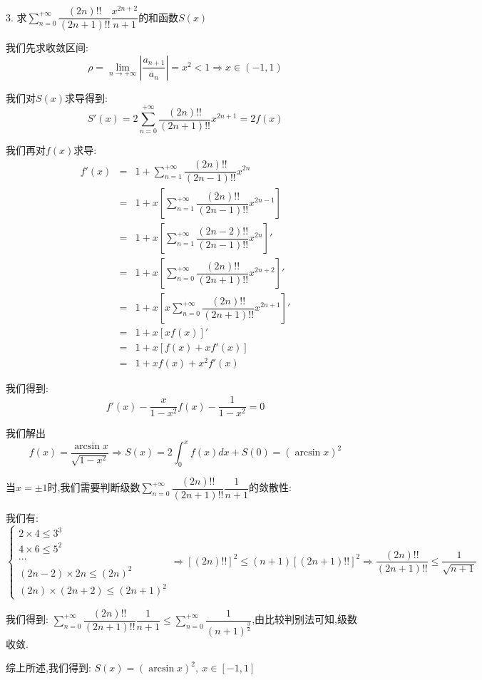 3. 求$\sum\limits_{n=0}^{+\infty}\dfrac{(2n)!!}{(2n+1)!!}\dfrac{x^{2n+2}}{n+1}$的和函数$S(x)$
\begin{solution}
	
	我们先求收敛区间: 
	$$\rho=\lim\limits_{n\rightarrow +\infty}|\dfrac{a_{n+1}}{a_{n}}|=x^2<1\Rightarrow x\in(-1,1)$$
	
	我们对$S(x)$求导得到: 
	$$S'(x)=2\sum\limits_{n=0}^{+\infty}\dfrac{(2n)!!}{(2n+1)!!}x^{2n+1}=2f(x)$$
	
	我们再对$f(x)$求导: 
	\begin{eqnarray*}
		f'(x)&=&1+\sum\limits_{n=1}^{+\infty}\dfrac{(2n)!!}{(2n-1)!!}x^{2n}\\
		&=&1+x[\sum\limits_{n=1}^{+\infty}\dfrac{(2n)!!}{(2n-1)!!}x^{2n-1}]\\
		&=&1+x[\sum\limits_{n=1}^{+\infty}\dfrac{(2n-2)!!}{(2n-1)!!}x^{2n}]'\\
		&=&1+x[\sum\limits_{n=0}^{+\infty}\dfrac{(2n)!!}{(2n+1)!!}x^{2n+2}]'\\
		&=&1+x[x\sum\limits_{n=0}^{+\infty}\dfrac{(2n)!!}{(2n+1)!!}x^{2n+1}]'\\
		&=&1+x[xf(x)]'\\
		&=&1+x[f(x)+xf'(x)]\\
		&=&1+xf(x)+x^2f'(x)
	\end{eqnarray*}

	我们得到: $$f'(x)-\dfrac{x}{1-x^2}f(x)-\dfrac{1}{1-x^2}=0$$
	
	我们解出$$f(x)=\dfrac{\arcsin x}{\sqrt{1-x^2}}\Rightarrow S(x)=2\int_{0} ^{x}f(x)dx+S(0)=(\arcsin x)^2$$
	
	当$x=\pm 1$时,我们需要判断级数$\sum\limits_{n=0}^{+\infty}\dfrac{(2n)!!}{(2n+1)!!}\dfrac{1}{n+1}$的敛散性: 
	
	我们有: $$\left\lbrace
	\begin{array}{l}
		2\times 4\leq 3^3\\
		4\times 6\leq 5^2\\
		\cdots\\
		(2n-2)\times 2n\leq (2n)^2\\
		(2n)\times(2n+2)\leq (2n+1)^2
	\end{array}
	\right. \Rightarrow [(2n)!!]^2\leq (n+1)[(2n+1)!!]^2\Rightarrow \dfrac{(2n)!!}{(2n+1)!!}\leq \dfrac{1}{\sqrt{n+1}}$$
	
	我们得到: $\sum\limits_{n=0}^{+\infty}\dfrac{(2n)!!}{(2n+1)!!}\dfrac{1}{n+1}\leq \sum\limits_{n=0}^{+\infty}\dfrac{1}{(n+1)^{\frac{3}{2}}}$,由比较判别法可知,级数收敛.
	
	综上所述,我们得到: $S(x)=(\arcsin x)^2,\ x\in[-1,1]$
\end{solution}

